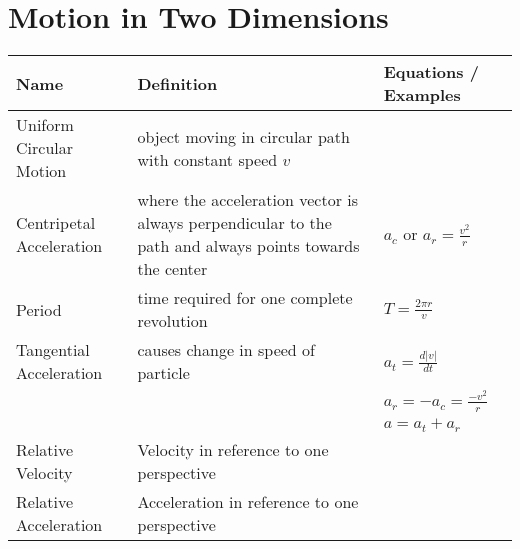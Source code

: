 \documentclass[11pt]{article}
\begin{document}
\section{Motion in Two Dimensions}
\begin{tabularx}{\textwidth}{l| X l}
    Name                     & Definition                                                                                             & Equations / Examples \\ \hline
    Uniform Circular Motion  & object moving in circular path with constant speed $ v $                                               & \\ \hline
    Centripetal Acceleration & where the acceleration vector is always perpendicular to the path and always points towards the center & $ a_{c} $ or $  a_{r} =\frac{v^2}{r} $ \bigstrut \\ \hline
    Period                   & time required for one complete revolution                                                              & $ T = \frac{2\pi r}{v} $ \bigstrut \\ \hline
    Tangential Acceleration  & causes change in speed of particle                                                                     & $ a_{t} = \frac{d|v|}{dt} $ \\*                            &  & $ a_{r} = -a_{c} = \frac{-v^2}{r} $ \\* &  & $ a = a_{t} + a_{r} $ \bigstrut \\ \hline
    Relative Velocity        & Velocity in reference to one perspective                                                               & \\  \hline
    Relative Acceleration    & Acceleration in reference to one perspective                                                           & \\ \hline
\end{tabularx}
\end{document}
